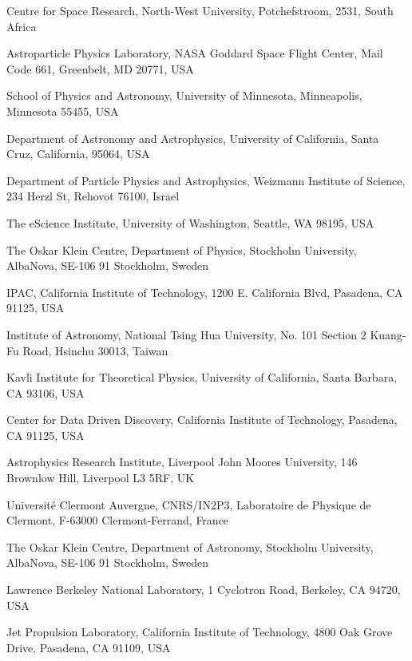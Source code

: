 \documentclass{nature_plusfigure}
\begin{document}
\begin{affiliations}
\item{Centre for Space Research, North-West University, Potchefstroom, 2531,
South Africa}
\item{Astroparticle Physics Laboratory, NASA Goddard Space Flight Center, Mail Code 661, Greenbelt, MD 20771, USA}
\item{School of Physics and Astronomy, University of Minnesota,
Minneapolis, Minnesota 55455, USA}
\item{Department of Astronomy and Astrophysics, University of California, Santa Cruz, California, 95064, USA}
\item{Department of Particle Physics and Astrophysics, Weizmann Institute of Science, 234 Herzl St, Rehovot 76100, Israel}
\item{The eScience Institute, University of Washington, Seattle, WA 98195, USA}
\item{The Oskar Klein Centre, Department of Physics,  Stockholm University,
AlbaNova, SE-106 91 Stockholm, Sweden}
\item{IPAC, California Institute of Technology, 1200 E. California Blvd, Pasadena, CA 91125, USA}
\item{Institute of Astronomy, National Tsing Hua University, No. 101 Section 2 Kuang-Fu Road, Hsinchu 30013, Taiwan}
\item{Kavli Institute for Theoretical Physics, University of California, Santa Barbara, CA 93106, USA}
\item{Center for Data Driven Discovery, California Institute of Technology, Pasadena, CA 91125, USA}
\item{Astrophysics Research Institute, Liverpool John Moores University, 146 Brownlow Hill, Liverpool L3 5RF, UK
}
\item{Universit\'e Clermont Auvergne, CNRS/IN2P3, Laboratoire de Physique de Clermont, F-63000 Clermont-Ferrand, France}
\item{The Oskar Klein Centre, Department of Astronomy,  Stockholm University,
AlbaNova, SE-106 91 Stockholm, Sweden}
\item{Lawrence Berkeley National Laboratory, 1 Cyclotron Road, Berkeley, CA 94720, USA}
\item{Jet Propulsion Laboratory, California Institute of Technology, 4800 Oak Grove Drive, Pasadena, CA 91109, USA}
\end{affiliations}
\end{document}
